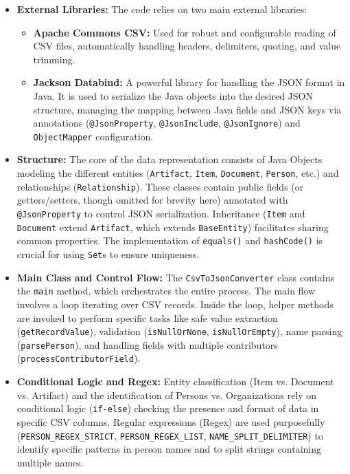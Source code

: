 \begin{itemize}
    \item \textbf{External Libraries:} The code relies on two main external libraries:
        \begin{itemize}
            \item \textbf{Apache Commons CSV:} Used for robust and configurable reading of CSV files, automatically handling headers, delimiters, quoting, and value trimming.
            \item \textbf{Jackson Databind:} A powerful library for handling the JSON format in Java. It is used to serialize the Java objects into the desired JSON structure, managing the mapping between Java fields and JSON keys via annotations (\texttt{@JsonProperty}, \texttt{@JsonInclude}, \texttt{@JsonIgnore}) and \texttt{ObjectMapper} configuration.
        \end{itemize}

    \item \textbf{Structure:} The core of the data representation consists of Java Objects modeling the different entities (\texttt{Artifact}, \texttt{Item}, \texttt{Document}, \texttt{Person}, etc.) and relationships (\texttt{Relationship}). These classes contain public fields (or getters/setters, though omitted for brevity here) annotated with \texttt{@JsonProperty} to control JSON serialization. Inheritance (\texttt{Item} and \texttt{Document} extend \texttt{Artifact}, which extends \texttt{BaseEntity}) facilitates sharing common properties. The implementation of \texttt{equals()} and \texttt{hashCode()} is crucial for using \texttt{Set}s to ensure uniqueness.

    \item \textbf{Main Class and Control Flow:} The \texttt{CsvToJsonConverter} class contains the \texttt{main} method, which orchestrates the entire process. The main flow involves a loop iterating over CSV records. Inside the loop, helper methods are invoked to perform specific tasks like safe value extraction (\texttt{getRecordValue}), validation (\texttt{isNullOrNone}, \texttt{isNullOrEmpty}), name parsing (\texttt{parsePerson}), and handling fields with multiple contributors (\texttt{processContributorField}).

    \item \textbf{Conditional Logic and Regex:} Entity classification (Item vs. Document vs. Artifact) and the identification of Persons vs. Organizations rely on conditional logic (\texttt{if-else}) checking the presence and format of data in specific CSV columns. Regular expressions (Regex) are used purposefully (\texttt{PERSON\_REGEX\_STRICT}, \texttt{PERSON\_REGEX\_LIST}, \texttt{NAME\_SPLIT\_DELIMITER}) to identify specific patterns in person names and to split strings containing multiple names.


\end{itemize}

